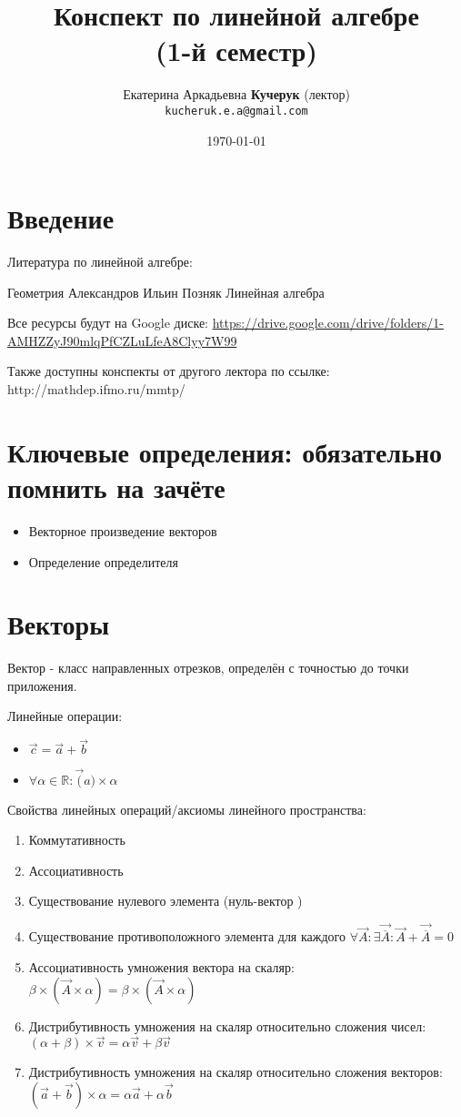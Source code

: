 \documentclass[12pt, a4paper]{article}
\title{Конспект по линейной алгебре \\ (1-й семестр)}
\author{
  \vova
  \and
  Екатерина Аркадьевна \textbf{Кучерук} (лектор)\\
  \texttt{kucheruk.e.a@gmail.com}
}
\date{\today}
\begin{document}
    \tittoc

    \section{Введение}

    Литература по линейной алгебре:

    Геометрия Александров
    Ильин Позняк  Линейная алгебра

    Все ресурсы будут на Google диске: \url{https://drive.google.com/drive/folders/1-AMHZZyJ90mlqPfCZLuLfeA8Clyy7W99}

    Также доступны конспекты от другого лектора по ссылке: http://mathdep.ifmo.ru/mmtp/

    \section{Ключевые определения: обязательно помнить на зачёте}
    \begin{itemize}
        \item Векторное произведение векторов
        \item Определение определителя
    \end{itemize}

    \section{Векторы}
    
    Вектор - класс направленных отрезков, 
    определён с точностью до точки приложения.

    Линейные операции:
    \begin{itemize}
        \item $\vec{c} = \vec{a} + \vec{b}$
        \item $\forall \alpha \in \mathbb{R}: \vec(a) \times \alpha$
    \end{itemize}

    Свойства линейных операций/аксиомы линейного пространства:
    \begin{enumerate}
        \item Коммутативность
        \item Ассоциативность
        \item Существование нулевого элемента (нуль-вектор  )
        \item Существование противоположного элемента для каждого 
                $\forall \vec{A}: \exists \vec{\overline{A}}: \vec{A} + \vec{\overline{A}} = 0$
        \item Ассоциативность умножения вектора на скаляр: $\beta \times (\vec{A} \times \alpha) = \beta \times (\vec{A} \times \alpha)$
        \item Дистрибутивность умножения на скаляр относительно сложения чисел: $(\alpha + \beta) \times \vec{v}  = \alpha \vec{v} + \beta \vec{v}$
        \item Дистрибутивность умножения на скаляр относительно сложения векторов: $(\vec{a} + \vec{b}) \times \alpha  = \alpha \vec{a} + \alpha \vec{b}$
    \end{enumerate}
    
\end{document}
